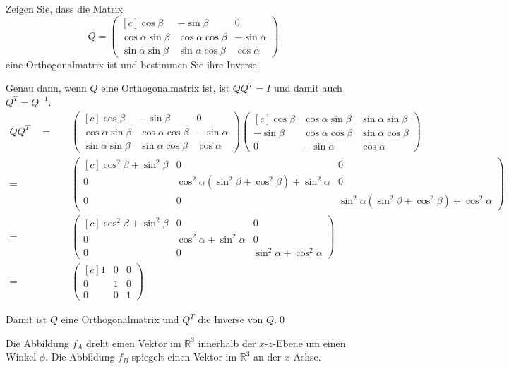 \documentclass[answers]{exam}
\newcommand{\vektor}[1]{\begin{pmatrix*}[c] #1 \end{pmatrix*}}
\newcommand{\R}{\mathbb{R}}
\begin{document}
\begin{questions}
    \newpage
    \question
    Zeigen Sie, dass die Matrix
    $$
        Q = \vektor{
            \cos \beta & -\sin\beta & 0 \\
            \cos \alpha \sin\beta & \cos\alpha \cos\beta & -\sin\alpha \\
            \sin\alpha \sin\beta & \sin\alpha \cos\beta & \cos\alpha
        }
    $$
    eine Orthogonalmatrix ist und bestimmen Sie ihre Inverse.
    \begin{solution}
        Genau dann, wenn $Q$ eine Orthogonalmatrix ist, ist $QQ^T = I$ und damit auch $Q^T = Q^{-1}$:
        $$
            \begin{aligned}
                QQ^T \quad = \quad  &
                \vektor{ \cos \beta & -\sin\beta                        & 0                        \\ \cos \alpha \sin\beta & \cos\alpha \cos\beta & -\sin\alpha \\ \sin\alpha \sin\beta & \sin\alpha \cos\beta & \cos\alpha }
                \vektor{ \cos\beta  & \cos\alpha \sin\beta              & \sin\alpha \sin\beta     \\ -\sin\beta & \cos\alpha \cos\beta & \sin\alpha \cos\beta \\ 0 & -\sin\alpha & \cos\alpha} \\
                = \quad             & \vektor{\cos^2\beta + \sin^2\beta & 0                    & 0 \\ 0 & \cos^2\alpha \left( \sin^2\beta + \cos^2\beta \right) + \sin^2\alpha & 0  \\ 0 & 0 & \sin^2\alpha \left( \sin^2\beta + \cos^2\beta \right) + \cos^2\alpha} \\
                = \quad             & \vektor{\cos^2\beta + \sin^2\beta & 0                    & 0 \\ 0 & \cos^2\alpha  + \sin^2\alpha & 0  \\ 0 & 0 & \sin^2\alpha + \cos^2\alpha} \\
                = \quad             & \vektor{1                         & 0                    & 0 \\ 0 & 1 & 0  \\ 0 & 0 & 1}
            \end{aligned}
        $$

        Damit ist $Q$ eine Orthogonalmatrix und $Q^T$ die Inverse von $Q$.\qed
    \end{solution}

    \newpage
    \question
    Die Abbildung $f_A$ dreht einen Vektor im $\R^3$ innerhalb der $x$-$z$-Ebene um einen Winkel $\phi$.
    Die Abbildung $f_B$ spiegelt einen Vektor im $\R^3$ an der $x$-Achse.
    \begin{parts}

\end{parts}
\end{questions}
\end{document}
